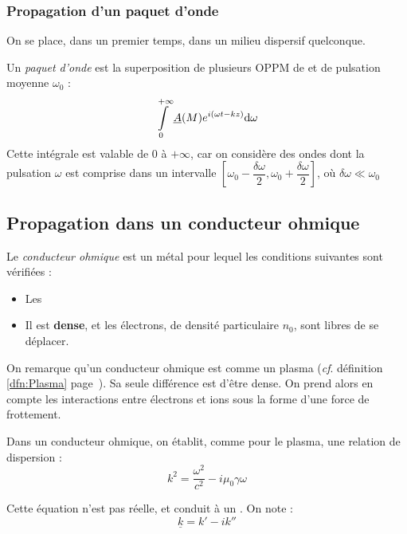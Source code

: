 \documentclass[11pt,a4paper,fleqn,pdftex]{report}
\begin{document}
\subsubsection{Propagation d'un paquet d'onde} %
\label{ssub:propagation_paquet_onde}
On se place, dans un premier temps, dans un milieu dispersif quelconque.
%
\needspace{7cm}
\begin{dfn}
   Un \emph{paquet d'onde} est la superposition de plusieurs \gls{OPPM} de  et de pulsation moyenne $\omega_0$ : 
   \begin{equation}
   \int \limits_0^{+\infty} \underline{A}(M) e^{i(\omega t - k z)}\mathrm{d} \omega
   \end{equation}
   Cette intégrale est valable de $0$ à $+\infty$, car on considère des ondes dont la pulsation $\omega$ est comprise dans un intervalle $\left[ \omega_0 - \dfrac{\delta \omega}{2}, \omega_0 + \dfrac{\delta \omega}{2}\right]$, où $\delta \omega \ll \omega_0$
\end{dfn}
\subsection{Propagation dans un conducteur ohmique} %
\label{sub:propagation_dans_un_conducteur_ohmique}
\begin{dfn}
   Le \emph{conducteur ohmique} est un métal pour lequel les conditions suivantes sont vérifiées :
\begin{itemize}[label=$\bullet$]
    \item Les 
    \item Il est \textcolor{couleurImp}{\textbf{dense}}, et les électrons, de densité particulaire $n_0$, sont libres de se déplacer.
\end{itemize}
On remarque qu'un conducteur ohmique est comme un plasma (\textit{cf}. définition \ref{dfn:Plasma} page~\pageref{dfn:Plasma}). Sa seule différence est d'être dense. On prend alors en compte les interactions entre électrons et ions sous la forme d'une force de frottement.
\end{dfn}
\begin{itheorem}
   Dans un conducteur ohmique, on établit, comme pour le plasma, une relation de dispersion :
   \begin{equation}
   k^2 = \dfrac{\omega^2}{c^2} - i\mu_0\gamma \omega
   \end{equation}
\end{itheorem}
Cette équation n'est pas réelle, et conduit à un . On note :
\begin{equation}
\underline{k} = k' - ik''
\end{equation}
\end{document}
